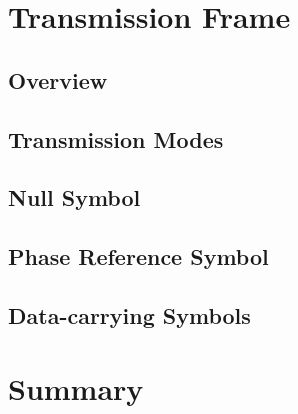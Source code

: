 \documentclass[class=report,11pt,crop=false]{standalone}
\begin{document}
\section{Transmission Frame}
\begin{figure}[htbp]
    \centering
    \captionsetup{type=figure}
    \def\svgwidth{1\linewidth}
    { %
    \scriptsize
    }
    \caption{}
    \label{fig:transmission-frame-illustration}
\end{figure}



\subsection{Overview}

\subsection{Transmission Modes}

\subsection{Null Symbol \label{subsect:dab-std_null}}


\subsection{Phase Reference Symbol \label{subsect:dab-std_prs}}


\subsection{Data-carrying Symbols \label{subsect:dab-std_data}}

\section{Summary}


\ifstandalone

\printnoidxglossary[type=\acronymtype, nonumberlist]
\fi
\end{document}
